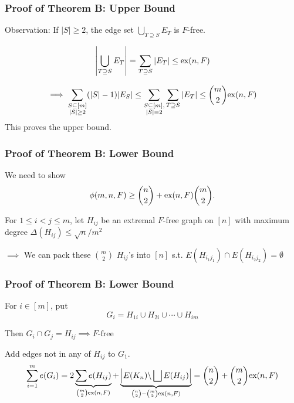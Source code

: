 \documentclass{beamer}
\newcommand*{\ex}{\textnormal{ex}}
\begin{document}
\begin{frame}
  \frametitle{Proof of Theorem B: Upper Bound}

  Observation: If $|S| \geq 2$, the edge set $\bigcup_{T \supseteq S} E_T$ is $F$-free.

  \pause

  \vspace{0.3cm}

  \[
    \left|\bigcup_{T \supseteq S} E_T\right| = \sum_{T \supseteq S} |E_T| \leq \ex(n, F)
  \]
  \pause

  \vspace{0.3cm}

  \[
    \implies \sum_{\substack{S \subseteq [m] \\ |S| \geq 2}} (|S| - 1)|E_S| \leq \sum_{\substack{S \subseteq [m], \\ |S| = 2}} \sum_{T \supseteq S} |E_T| \leq \binom{m}{2}\ex(n, F)
  \]
  This proves the upper bound.
\end{frame}

\begin{frame}
  \frametitle{Proof of Theorem B: Lower Bound}

  We need to show
  \[  
    \phi(m, n ,F) \geq \binom{n}{2} + \ex(n, F)\binom{m}{2}.  
  \]

  \pause
  \vspace{0.3cm}

  For $1 \leq i < j \leq m$, let $H_{ij}$ be an extremal $F$-free graph on $[n]$ with maximum degree $\Delta(H_{ij}) \leq \sqrt{n}/m^2$

  \pause

  \vspace{0.5cm}

  $\implies$ We can pack these $\binom{m}{2}$ $H_{ij}$'s into $[n]$ s.t. $E(H_{i_1j_1}) \cap E(H_{i_2j_2}) = \emptyset$
\end{frame}

\begin{frame}
  \frametitle{Proof of Theorem B: Lower Bound}

  For $i \in [m]$, put 
  \[
    G_i = H_{1i} \cup H_{2i} \cup \cdots \cup H_{im}
  \]
  \pause

  Then $G_i \cap G_j = H_{ij} \implies F\text{-free}$

  \pause

  \vspace{0.7cm}

  Add edges not in any of $H_{ij}$ to $G_1$.
  \[
    \sum_{i = 1}^m e(G_i) = 2\underbrace{\sum e(H_{ij})}_{\binom{m}{2}\ex(n, F)} + \underbrace{\left|E(K_n)\backslash \bigsqcup E(H_{ij})\right|}_{\binom{n}{2} - \binom{m}{2}\ex(n, F)} = \binom{n}{2} + \binom{m}{2}\ex(n, F)
  \]
\end{frame}
\end{document}
